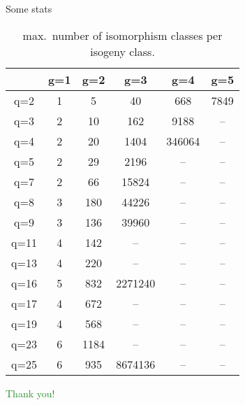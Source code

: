 \documentclass[usenames,dvipsnames,handout]{beamer}
\newcommand{\green}[1]{\textcolor{ForestGreen}{#1}}
\begin{document}
\begin{frame}{ Some stats }
    \small 
    \begin{table}[h!]
        \begin{tabular}{|c|c|c|c|c|c|}\hline
            & g=1 & g=2 & g=3 & g=4 & g=5 \\\hline
            q=2 & 1 & 5 & 40 & 668 & 7849 \\\hline
            q=3 & 2 & 10 & 162 & 9188 &-- \\\hline
            q=4 & 2 & 20 & 1404 & 346064 &-- \\\hline
            q=5 & 2 & 29 & 2196 &-- &-- \\\hline
            q=7 & 2 & 66 & 15824 &-- &-- \\\hline
            q=8 & 3 & 180 & 44226 &-- &-- \\\hline
            q=9 & 3 & 136 & 39960 &-- &-- \\\hline
            q=11 & 4 & 142 &-- &-- &-- \\\hline
            q=13 & 4 & 220 &-- &-- &-- \\\hline
            q=16 & 5 & 832 & 2271240 &-- &-- \\\hline
            q=17 & 4 & 672 &-- &-- &-- \\\hline
            q=19 & 4 & 568 &-- &-- &-- \\\hline
            q=23 & 6 & 1184 &-- &-- &-- \\\hline
            q=25 & 6 & 935 & 8674136 &-- &-- \\\hline
           
        \end{tabular}
    \caption{max.~number of isomorphism classes per isogeny class.}
    \end{table}
\end{frame}


\begin{frame}{ }
\begin{center}
\green{\huge Thank you!}
\end{center}
\end{frame}
\end{document}
